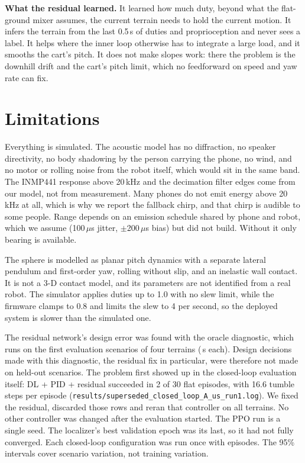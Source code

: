 \textbf{What the residual learned.} It learned how much duty, beyond what the flat-ground mixer
assumes, the current terrain needs to hold the current motion. It infers the terrain from the
last 0.5\,s of duties and proprioception and never sees a label. It helps where the inner loop
otherwise has to integrate a large load, and it smooths the cart's pitch. It does not make
slopes work: there the problem is the downhill drift and the cart's pitch limit, which no
feedforward on speed and yaw rate can fix.

\section{Limitations}

Everything is simulated. The acoustic model has no diffraction, no speaker directivity, no
body shadowing by the person carrying the phone, no wind, and no motor or rolling noise from
the robot itself, which would sit in the same band. The INMP441 response above 20\,kHz and the
decimation filter edges come from our model, not from measurement. Many phones do not emit
energy above 20\,kHz at all, which is why we report the fallback chirp, and that chirp is
audible to some people. Range depends on an emission schedule shared by phone and robot, which
we assume (100\,$\mu$s jitter, $\pm$200\,$\mu$s bias) but did not build. Without it only
bearing is available.

The sphere is modelled as planar pitch dynamics with a separate lateral pendulum and
first-order yaw, rolling without slip, and an inelastic wall contact. It is not a 3-D contact
model, and its parameters are not identified from a real robot. The simulator applies duties
up to 1.0 with no slew limit, while the firmware clamps to 0.8 and limits the slew to 4 per
second, so the deployed system is slower than the simulated one.

The residual network's design error was found with the oracle diagnostic, which runs on the
first \DbgN{} evaluation scenarios of four terrains (\DbgSeconds\,s each). Design decisions made
with this diagnostic, the residual fix in particular, were therefore not made on held-out
scenarios. The problem first showed up in the closed-loop evaluation itself: DL + PID + residual
succeeded in 2 of 30 flat episodes, with 16.6 tumble steps per episode
(\texttt{results/superseded\_closed\_loop\_A\_us\_run1.log}). We fixed the residual, discarded those rows and reran that controller on all
terrains. No other controller was changed after the evaluation started. The PPO run is a single seed. The localizer's best validation
epoch was its last, so it had not fully converged. Each closed-loop configuration was run once
with \CLAusN{} episodes. The 95\% intervals cover scenario variation, not training variation.


